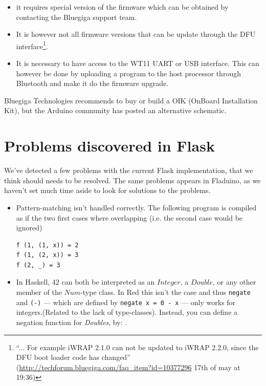 \documentclass[a4paper, oneside, final]{memoir}
\begin{document}
\begin{itemize}
\item it requires special version of the firmware which can be obtained by
  contacting the Bluegiga support team.

\item It is however not all firmware versions that can be update through the DFU
  interface\footnote{``... For example iWRAP 2.1.0 can not be updated to iWRAP
    2.2.0, since the DFU boot loader code has changed''
    (\url{http://techforum.bluegiga.com/faq_item?id=10377296} 17th of may at
    19:36)}.

\item It is necessary to have access to the WT11 UART or USB
  interface. This can however be done by uploading a program to the host
  processor through Bluetooth and make it do the firmware upgrade.
\end{itemize}

Bluegiga Technologies recommends to buy or build\cite{oik_chematic} a OIK
(OnBoard Installation Kit), but the Arduino community has posted an
alternative schematic\cite{oik_chematic_arduino}.


\chapter{Problems discovered in Flask }
We've detected a few problems with the current Flask implementation,
that we think should needs to be resolved. The same problems appears
in Fladuino, as we haven't set much time aside to look for solutions
to the problems.

\begin{itemize}
\item Pattern-matching isn't handled correctly. The following program
  is compiled as if the two first cases where overlapping (i.e. the
  second case would be ignored)
\begin{verbatim}
f (1, (1, x)) = 2
f (1, (2, x)) = 3
f (2, _) = 3
\end{verbatim}

\item In Haskell, 42 can both be interpreted as an $Integer$, a
  $Double$, or any other member of the $Num$-type class. In Red this
  isn't the case and thus \texttt{negate} and \texttt{(-)} --- which
  are defined by \verb|negate x = 0 - x| --- only works for
  integers.(Related to the lack of type-classes). Instead, you can
  define a negation function for \textit{Doubles}, by: .
\end{itemize}
\end{document}
